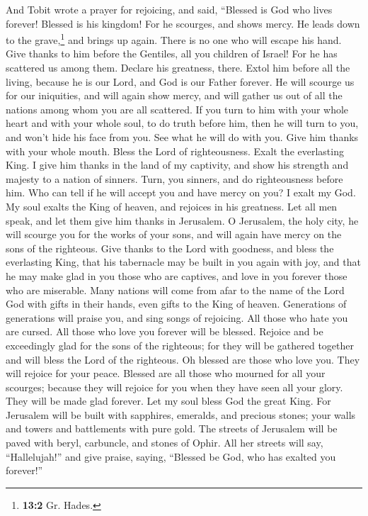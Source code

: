  And Tobit wrote a prayer for rejoicing, and said,
``Blessed is God who lives forever! Blessed is his kingdom!
 For he scourges, and shows mercy. He leads down to the
grave,\footnote{\textbf{13:2} Gr. Hades.} and brings up again. There is
no one who will escape his hand.  Give thanks to him
before the Gentiles, all you children of Israel! For he has scattered us
among them.  Declare his greatness, there. Extol him
before all the living, because he is our Lord, and God is our Father
forever.  He will scourge us for our iniquities, and will
again show mercy, and will gather us out of all the nations among whom
you are all scattered.  If you turn to him with your whole
heart and with your whole soul, to do truth before him, then he will
turn to you, and won't hide his face from you. See what he will do with
you. Give him thanks with your whole mouth. Bless the Lord of
righteousness. Exalt the everlasting King. I give him thanks in the land
of my captivity, and show his strength and majesty to a nation of
sinners. Turn, you sinners, and do righteousness before him. Who can
tell if he will accept you and have mercy on you?  I exalt
my God. My soul exalts the King of heaven, and rejoices in his
greatness.  Let all men speak, and let them give him
thanks in Jerusalem.  O Jerusalem, the holy city, he will
scourge you for the works of your sons, and will again have mercy on the
sons of the righteous.  Give thanks to the Lord with
goodness, and bless the everlasting King, that his tabernacle may be
built in you again with joy, and that he may make glad in you those who
are captives, and love in you forever those who are miserable.
 Many nations will come from afar to the name of the Lord
God with gifts in their hands, even gifts to the King of heaven.
Generations of generations will praise you, and sing songs of rejoicing.
 All those who hate you are cursed. All those who love
you forever will be blessed.  Rejoice and be exceedingly
glad for the sons of the righteous; for they will be gathered together
and will bless the Lord of the righteous.  Oh blessed are
those who love you. They will rejoice for your peace. Blessed are all
those who mourned for all your scourges; because they will rejoice for
you when they have seen all your glory. They will be made glad forever.
 Let my soul bless God the great King. 
For Jerusalem will be built with sapphires, emeralds, and precious
stones; your walls and towers and battlements with pure gold.
 The streets of Jerusalem will be paved with beryl,
carbuncle, and stones of Ophir.  All her streets will
say, ``Hallelujah!'' and give praise, saying, ``Blessed be God, who has
exalted you forever!''

